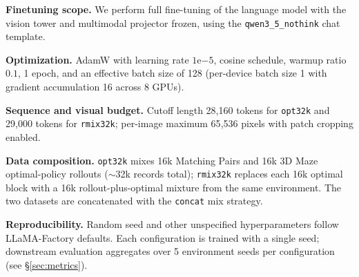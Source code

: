 \documentclass{llmxive}
\begin{document}
\noindent\textbf{Finetuning scope.} We perform full fine-tuning of the language model with the vision tower and multimodal projector frozen, using the \texttt{qwen3\_5\_nothink} chat template.

\noindent\textbf{Optimization.} AdamW with learning rate $1\mathrm{e}{-5}$, cosine schedule, warmup ratio $0.1$, 1 epoch, and an effective batch size of 128 (per-device batch size 1 with gradient accumulation 16 across 8 GPUs).

\noindent\textbf{Sequence and visual budget.} Cutoff length 28{,}160 tokens for \texttt{opt32k} and 29{,}000 tokens for \texttt{rmix32k}; per-image maximum 65{,}536 pixels with patch cropping enabled.

\noindent\textbf{Data composition.} \texttt{opt32k} mixes 16k Matching Pairs and 16k 3D Maze optimal-policy rollouts ($\sim$32k records total); \texttt{rmix32k} replaces each 16k optimal block with a 16k rollout-plus-optimal mixture from the same environment. The two datasets are concatenated with the \texttt{concat} mix strategy.

\noindent\textbf{Reproducibility.} Random seed and other unspecified hyperparameters follow LLaMA-Factory defaults. Each configuration is trained with a single seed; downstream evaluation aggregates over 5 environment seeds per configuration (see §\ref{sec:metrics}).


\end{document}
